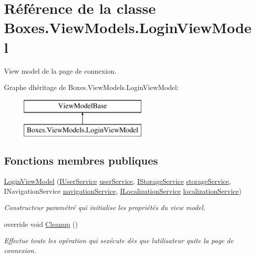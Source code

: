 \hypertarget{class_boxes_1_1_view_models_1_1_login_view_model}{}\section{Référence de la classe Boxes.\+View\+Models.\+Login\+View\+Model}
\label{class_boxes_1_1_view_models_1_1_login_view_model}


View model de la page de connexion.  


Graphe d\textquotesingle{}héritage de Boxes.\+View\+Models.\+Login\+View\+Model\+:\begin{figure}[H]
\begin{center}
\leavevmode
\includegraphics[height=2.000000cm]{class_boxes_1_1_view_models_1_1_login_view_model}
\end{center}
\end{figure}
\subsection*{Fonctions membres publiques}
\begin{DoxyCompactItemize}
\item 
\hyperlink{class_boxes_1_1_view_models_1_1_login_view_model_acca51ef8bffac884fa5713752d1ff703}{Login\+View\+Model} (\hyperlink{interface_boxes_1_1_services_1_1_user_1_1_i_user_service}{I\+User\+Service} \hyperlink{class_boxes_1_1_view_models_1_1_login_view_model_a8cba7200b33227b306f2e67b41913ed6}{user\+Service}, \hyperlink{interface_boxes_1_1_services_1_1_storage_1_1_i_storage_service}{I\+Storage\+Service} \hyperlink{class_boxes_1_1_view_models_1_1_login_view_model_a0e1f19d329c368d76bc2872066a31fd6}{storage\+Service}, I\+Navigation\+Service \hyperlink{class_boxes_1_1_view_models_1_1_login_view_model_a0381d903ddcdc0df8cd8ade8fb991120}{navigation\+Service}, \hyperlink{interface_boxes_1_1_services_1_1_localization_1_1_i_localization_service}{I\+Localization\+Service} \hyperlink{class_boxes_1_1_view_models_1_1_login_view_model_a16b58520549ca46282be67efae03e395}{localization\+Service})
\begin{DoxyCompactList}\small\item\em Constructeur paramétré qui initialise les propriétés du view model. \end{DoxyCompactList}\item 
override void \hyperlink{class_boxes_1_1_view_models_1_1_login_view_model_a69b6f79536335b7fff2adde087276151}{Cleanup} ()
\begin{DoxyCompactList}\small\item\em Effectue toute les opération qui s\textquotesingle{}exécute dès que l\textquotesingle{}utilisateur quite la page de connexion. \end{DoxyCompactList}\end{DoxyCompactItemize}

